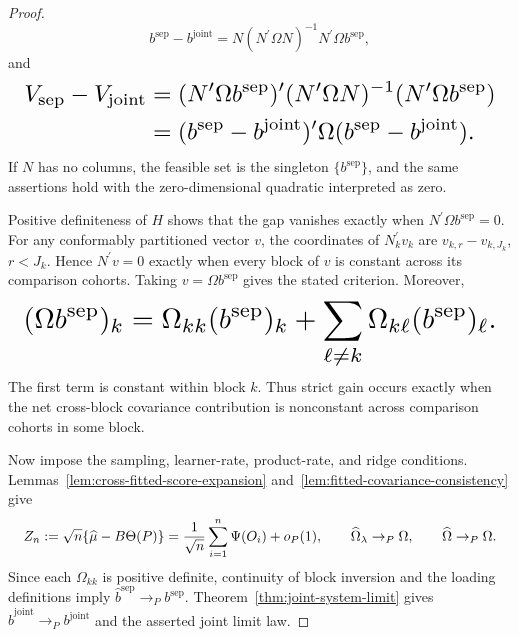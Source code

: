 \documentclass{article}
\begin{document}
\begin{proof}
\[
 b^{\mathrm{sep}}-b^{\mathrm{joint}}
 =N(N^{\prime}\Omega N)^{-1}N^{\prime}\Omega b^{\mathrm{sep}},
\]
and
\[
\makebox[\linewidth][c]{\resizebox{0.98\linewidth}{!}{\(\displaystyle \begin{aligned}
 V_{\mathrm{sep}}-V_{\mathrm{joint}}
 &=(N^{\prime}\Omega b^{\mathrm{sep}})^{\prime}
 (N^{\prime}\Omega N)^{-1}
 (N^{\prime}\Omega b^{\mathrm{sep}})\\
 &=(b^{\mathrm{sep}}-b^{\mathrm{joint}})^{\prime}
 \Omega(b^{\mathrm{sep}}-b^{\mathrm{joint}}).
\end{aligned}\)}}
\]
If \(N\) has no columns, the feasible set is the singleton \(\{b^{\mathrm{sep}}\}\), and the same assertions hold with the zero-dimensional quadratic interpreted as zero.

Positive definiteness of \(H\) shows that the gap vanishes exactly when \(N^{\prime}\Omega b^{\mathrm{sep}}=0\). For any conformably partitioned vector \(v\), the coordinates of \(N_k^{\prime}v_k\) are \(v_{k,r}-v_{k,J_k}\), \(r<J_k\). Hence \(N^{\prime}v=0\) exactly when every block of \(v\) is constant across its comparison cohorts. Taking \(v=\Omega b^{\mathrm{sep}}\) gives the stated criterion. Moreover,
\[
\makebox[\linewidth][c]{\resizebox{0.98\linewidth}{!}{\(\displaystyle (\Omega b^{\mathrm{sep}})_k
 =\Omega_{kk}(b^{\mathrm{sep}})_k
 +\sum_{\ell\ne k}\Omega_{k\ell}(b^{\mathrm{sep}})_\ell.\)}}
\]
The first term is constant within block \(k\). Thus strict gain occurs exactly when the net cross-block covariance contribution is nonconstant across comparison cohorts in some block.

Now impose the sampling, learner-rate, product-rate, and ridge conditions. Lemmas~\ref{lem:cross-fitted-score-expansion} and~\ref{lem:fitted-covariance-consistency} give
\[
\makebox[\linewidth][c]{\resizebox{0.98\linewidth}{!}{\(\displaystyle Z_n:=\sqrt n\{\widehat\mu-B\Theta(P)\}
 =\frac1{\sqrt n}\sum_{i=1}^n\Psi(O_i)+o_P(1),
 \qquad
 \widehat\Omega_\lambda\to_P\Omega,
 \qquad
 \widehat\Omega\to_P\Omega.\)}}
\]
Since each \(\Omega_{kk}\) is positive definite, continuity of block inversion and the loading definitions imply \(\widehat b^{\mathrm{sep}}\to_Pb^{\mathrm{sep}}\). Theorem~\ref{thm:joint-system-limit} gives \(\widehat b^{\mathrm{joint}}\to_Pb^{\mathrm{joint}}\) and the asserted joint limit law.


\end{proof}
\end{document}
